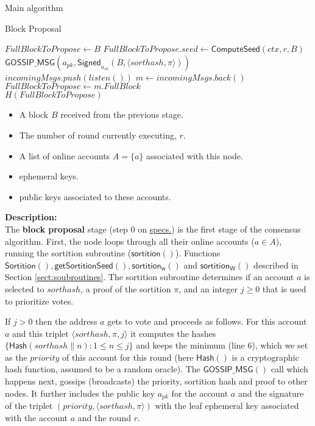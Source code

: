 \documentclass[10pt,a4paper]{article}
\begin{document}
\begin{section}{Main algorithm}
\begin{subsection}{Block Proposal}
\begin{algorithm}
\begin{algorithmic}[1]
            \State $FullBlockToPropose \gets B$
            \State $FullBlockToPropose.seed \gets \mathsf{ComputeSeed}(ctx, r, B)$
            \State $\mathsf{GOSSIP\_MSG}(a_{pk}, \mathsf{Signed}_{a_{sk}}(B, \langle sorthash, \pi \rangle))$
        \Else
        {
                \State $incomingMsgs.push(listen())$
                \State $m \gets incomingMsgs.back()$
                    \State $FullBlockToPropose \gets m.FullBlock$
                \EndIf
            \EndWhile \\
        }
        \EndIf
        \Return $H(FullBlockToPropose)$
    \EndFunction
    \end{algorithmic}
    \caption{\underline{Block proposal}}
\end{algorithm}

\newpage
{}
\begin{itemize}
    \item A block $B$ received from the previous stage.
    \item The number of round currently executing, $r$.
    \item A list of online accounts  $A=\{a\}$ associated with this node.
    \item ephemeral keys.
    \item public keys associated to these accounts.
  \end{itemize}
\noindent \textbf{Description:}\\
The {\bf block proposal} stage (step 0 on \href{https://github.com/algorandfoundation/specs}{specs.}) is the first stage of the 
consensus algorithm. 
First, the node loops through all their online accounts ($a\in A$), 
running the sortition subroutine ($\mathsf{sortition}()$).
Functions  $\mathsf{Sortition}(), \mathsf{getSortitionSeed}(), \mathsf{sortition_w}()$ and
$\mathsf{sortition_W}()$ described in Section \ref{sect:soubroutines}.
The sortition subroutine determines if an account $a$ is selected to 
${sorthash}$, a proof of the sortition $\pi$, and an integer $j\ge 0$
that is used to prioritize votes.

If $j>0$ then the address $a$ gets to vote and proceeds as follows.
For this account $a$ and this triplet $\langle sorthash, \pi, j\rangle$
it computes the hashes $\{ \mathsf{Hash}(sorthash \| n):1\le n\le j\}$
and keeps the minimum (line 6), which we set as the $priority$ of this
account for this round (here $\mathsf{Hash}()$ is a cryptographic hash
function, assumed to be a random oracle).
The $\mathsf{GOSSIP\_MSG}()$ call which happens next, gossips (broadcasts) 
the priority, sortition hash and proof to other nodes.
It further includes the public key $a_{pk}$ for the account $a$ and the
signature of the triplet $(priority, \langle sorthash, \pi\rangle)$ with the 
leaf ephemeral key associated with the account $a$ and the round $r$.


\end{subsection}
\end{section}
\end{document}
